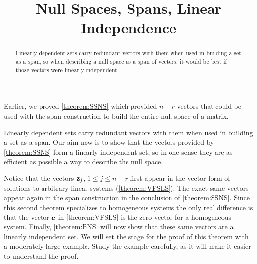 \documentclass{ximera}
\title{Null Spaces, Spans, Linear Independence}
\begin{document}
\begin{abstract}
  Linearly dependent sets carry redundant vectors with them when used
  in building a set as a span, so when describing a null space as a
  span of vectors, it would be best if those vectors were linearly
  independent.
\end{abstract}
\maketitle

Earlier, we proved \ref{theorem:SSNS} which provided $n-r$ vectors
that could be used with the span construction to build the entire null
space of a matrix.

Linearly dependent sets carry redundant vectors with them when used in
building a set as a span.  Our aim now is to show that the vectors
provided by \ref{theorem:SSNS} form a linearly independent set, so in
one sense they are as efficient as possible a way to describe the null
space.

Notice that the vectors $\mathbf{z}_j$, $1\leq j\leq n-r$ first appear
in the vector form of solutions to arbitrary linear systems
(\ref{theorem:VFSLS}).  The exact same vectors appear again in the
span construction in the conclusion of \ref{theorem:SSNS}.  Since this
second theorem specializes to homogeneous systems the only real
difference is that the vector $\mathbf{c}$ in \ref{theorem:VFSLS} is the
zero vector for a homogeneous system.  Finally, \ref{theorem:BNS} will
now show that these same vectors are a linearly independent set.  We
will set the stage for the proof of this theorem with a moderately
large example.  Study the example carefully, as it will make it easier
to understand the proof.
\end{document}
